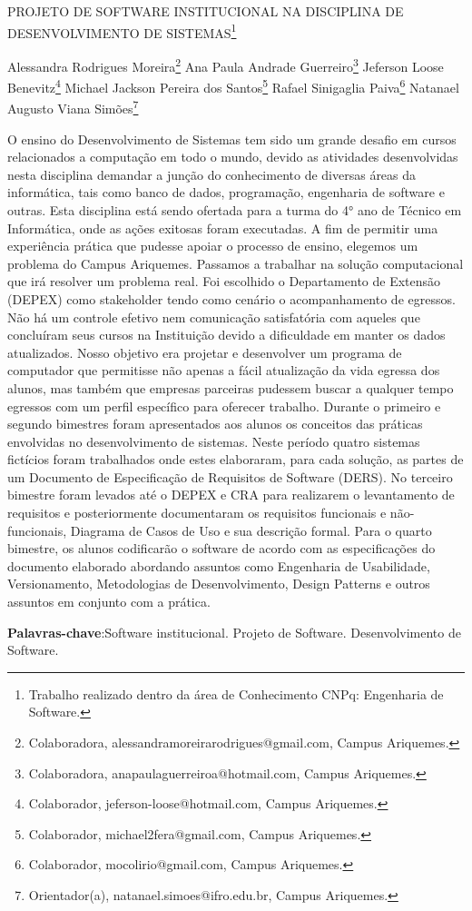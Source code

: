 \documentclass[article,12pt,onesidea,4paper,english,brazil]{abntex2}
\begin{document}
	
	
	\frenchspacing 
	
	\begin{center}
		\LARGE PROJETO DE SOFTWARE INSTITUCIONAL NA DISCIPLINA DE
		DESENVOLVIMENTO DE SISTEMAS\footnote{Trabalho realizado dentro da área de Conhecimento CNPq: Engenharia de Software.}
		
		\normalsize
	Alessandra Rodrigues Moreira\footnote{Colaboradora, alessandramoreirarodrigues@gmail.com, Campus Ariquemes.} 
	Ana Paula Andrade Guerreiro\footnote{Colaboradora, anapaulaguerreiroa@hotmail.com, Campus Ariquemes.} 
	Jeferson Loose Benevitz\footnote{Colaborador, jeferson-loose@hotmail.com, Campus Ariquemes.} 
    Michael Jackson Pereira dos Santos\footnote{Colaborador, michael2fera@gmail.com, Campus Ariquemes.} 
	Rafael Sinigaglia Paiva\footnote{Colaborador, mocolirio@gmail.com, Campus Ariquemes.} 
    Natanael Augusto Viana Simões\footnote{Orientador(a), natanael.simoes@ifro.edu.br, Campus Ariquemes.} 
	\end{center}
	
	\noindent O ensino do Desenvolvimento de Sistemas tem sido um grande desafio em cursos
	relacionados a computação em todo o mundo, devido as atividades desenvolvidas
	nesta disciplina demandar a junção do conhecimento de diversas áreas da
	informática, tais como banco de dados, programação, engenharia de software e
	outras. Esta disciplina está sendo ofertada para a turma do 4° ano de Técnico em
	Informática, onde as ações exitosas foram executadas. A fim de permitir uma
	experiência prática que pudesse apoiar o processo de ensino, elegemos um
	problema do Campus Ariquemes. Passamos a trabalhar na solução computacional
	que irá resolver um problema real. Foi escolhido o Departamento de Extensão
	(DEPEX) como stakeholder tendo como cenário o acompanhamento de egressos.
	Não há um controle efetivo nem comunicação satisfatória com aqueles que
	concluíram seus cursos na Instituição devido a dificuldade em manter os dados
	atualizados. Nosso objetivo era projetar e desenvolver um programa de computador
	que permitisse não apenas a fácil atualização da vida egressa dos alunos, mas
	também que empresas parceiras pudessem buscar a qualquer tempo egressos com
	um perfil específico para oferecer trabalho. Durante o primeiro e segundo bimestres
	foram apresentados aos alunos os conceitos das práticas envolvidas no
	desenvolvimento de sistemas. Neste período quatro sistemas fictícios foram
	trabalhados onde estes elaboraram, para cada solução, as partes de um Documento
	de Especificação de Requisitos de Software (DERS). No terceiro bimestre foram
	levados até o DEPEX e CRA para realizarem o levantamento de requisitos e
	posteriormente documentaram os requisitos funcionais e não-funcionais, Diagrama
	de Casos de Uso e sua descrição formal. Para o quarto bimestre, os alunos
	codificarão o software de acordo com as especificações do documento elaborado
	abordando assuntos como Engenharia de Usabilidade, Versionamento,
	Metodologias de Desenvolvimento, Design Patterns e outros assuntos em conjunto
	com a prática.
	
	\vspace{\onelineskip}
	
	\noindent
	\textbf{Palavras-chave}:Software institucional. Projeto de Software. Desenvolvimento de Software.
	
\end{document}
